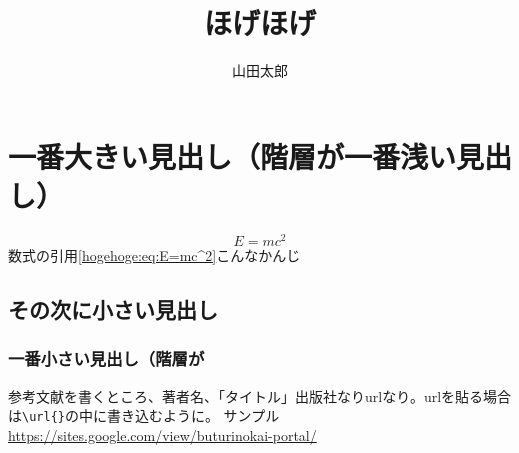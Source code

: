 \documentclass[a4paper,oneside]{jsbook}
\begin{document}
\title{ほげほげ}
\author{山田太郎}
\date{}%
\maketitle


\section{一番大きい見出し（階層が一番浅い見出し）}
\begin{equation}
  E=mc^2\label{hogehoge:eq:E=mc^2}
\end{equation}
数式の引用\eqref{hogehoge:eq:E=mc^2}こんなかんじ

\subsection{その次に小さい見出し}

\subsubsection{一番小さい見出し（階層が}






\let\oldaddcontentsline\addcontentsline%
\renewcommand{\addcontentsline}[3]{}
\begin{thebibliography}{99}
    参考文献を書くところ、著者名、「タイトル」出版社なりurlなり。urlを貼る場合は\verb|\url{}|の中に書き込むように。
    サンプル\url{https://sites.google.com/view/buturinokai-portal/}
\end{thebibliography}
\let\addcontentsline\oldaddcontentsline
\end{document}
